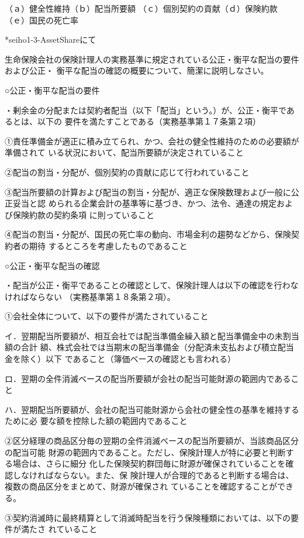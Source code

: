\documentclass[report,gutter=10mm,fore-edge=10mm,uplatex,dvipdfmx]{jlreq}
\begin{document}
\answer{}
（ａ）健全性維持（ｂ）配当所要額
（ｃ）個別契約の貢献（ｄ）保険約款
（ｅ）国民の死亡率

*seiho1-3-AssetShareにて

生命保険会社の保険計理人の実務基準に規定されている公正・衡平な配当の要件および公正・
衡平な配当の確認の概要について、簡潔に説明しなさい。

\answer{}
○公正・衡平な配当の要件

・剰余金の分配または契約者配当（以下「配当」という。）が、公正・衡平であるとは、以下の
要件を満たすことである（実務基準第１７条第２項）

①責任準備金が適正に積み立てられ、かつ、会社の健全性維持のための必要額が準備されて
いる状況において、配当所要額が決定されていること

②配当の割当・分配が、個別契約の貢献に応じて行われていること

③配当所要額の計算および配当の割当・分配が、適正な保険数理および一般に公正妥当と認
められる企業会計の基準等に基づき、かつ、法令、通達の規定および保険約款の契約条項
に則っていること

④配当の割当・分配が、国民の死亡率の動向、市場金利の趨勢などから、保険契約者の期待
するところを考慮したものであること

○公正・衡平な配当の確認

・配当が公正・衡平であることの確認として、保険計理人は以下の確認を行わなければならない
（実務基準第１８条第２項）。

①会社全体について、以下の要件が満たされていること

イ．翌期配当所要額が、相互会社では配当準備金繰入額と配当準備金中の未割当額の合計
額、株式会社では当期末の配当準備金（分配済未支払および積立配当金を除く）以下
であること（簿価ベースの確認とも言われる）

ロ．翌期の全件消滅ベースの配当所要額が会社の配当可能財源の範囲内であること

ハ．翌期配当所要額が、会社の配当可能財源から会社の健全性の基準を維持するために必
要な額を控除した額の範囲内であること

②区分経理の商品区分毎の翌期の全件消滅ベースの配当所要額が、当該商品区分の配当可能
財源の範囲内であること。ただし、保険計理人が特に必要と判断する場合は、さらに細分
化した保険契約群団毎に財源が確保されていることを確認しなければならない。また、保
険計理人が合理的であると判断する場合は、複数の商品区分をまとめて、財源が確保され
ていることを確認することができる。

③契約消滅時に最終精算として消滅時配当を行う保険種類においては、以下の要件が満たさ
れていること
\end{document}
